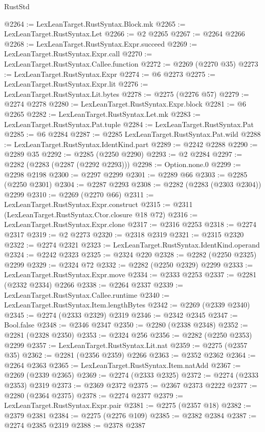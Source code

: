 \begin{lexlean}{RustStd}
\begin{coremodule}
{\begin{coremodule}
{{{{{{{{{{{{{{@2264 := LexLeanTarget.RustSyntax.Block.mk
@2265 := LexLeanTarget.RustSyntax.Let
@2266 := @2 @2265
@2267 := @2264 @2266
@2268 := LexLeanTarget.RustSyntax.Expr.succeed
@2269 := LexLeanTarget.RustSyntax.Expr.call
@2270 := LexLeanTarget.RustSyntax.Callee.function
@2272 := @2269 (@2270 @35)
@2273 := LexLeanTarget.RustSyntax.Expr
@2274 := @6 @2273
@2275 := LexLeanTarget.RustSyntax.Expr.lit
@2276 := LexLeanTarget.RustSyntax.Lit.bytes
@2278 := @2275 (@2276 @57)
@2279 := @2274 @2278
@2280 := LexLeanTarget.RustSyntax.Expr.block
@2281 := @6 @2265
@2282 := LexLeanTarget.RustSyntax.Let.mk
@2283 := LexLeanTarget.RustSyntax.Pat.tuple
@2284 := LexLeanTarget.RustSyntax.Pat
@2285 := @6 @2284
@2287 := @2285 LexLeanTarget.RustSyntax.Pat.wild
@2288 := LexLeanTarget.RustSyntax.IdentKind.part
@2289 := @2242 @2288
@2290 := @2289 @35
@2292 := @2285 (@2250 @2290)
@2293 := @2 @2284
@2297 := @2282 (@2283 (@2287 (@2292 @2293)))
@2298 := Option.none.{0}
@2299 := @2298 @2198
@2300 := @2297 @2299
@2301 := @2289 @66
@2303 := @2285 (@2250 @2301)
@2304 := @2287 @2293
@2308 := @2282 (@2283 (@2303 @2304)) @2299
@2310 := @2269 (@2270 @66)
@2311 := LexLeanTarget.RustSyntax.Expr.construct
@2315 := @2311 (LexLeanTarget.RustSyntax.Ctor.closure @18 @72)
@2316 := LexLeanTarget.RustSyntax.Expr.clone
@2317 := @2316 @2253
@2318 := @2274 @2317
@2319 := @2 @2273
@2320 := @2318 @2319
@2321 := @2315 @2320
@2322 := @2274 @2321
@2323 := LexLeanTarget.RustSyntax.IdentKind.operand
@2324 := @2242 @2323
@2325 := @2324 @220
@2328 := @2282 (@2250 @2325) @2299
@2329 := @2324 @72
@2332 := @2282 (@2250 @2329) @2299
@2333 := LexLeanTarget.RustSyntax.Expr.move
@2334 := @2333 @2253
@2337 := @2281 (@2332 @2334) @2266
@2338 := @2264 @2337
@2339 := LexLeanTarget.RustSyntax.Callee.runtime
@2340 := LexLeanTarget.RustSyntax.Item.lengthBytes
@2342 := @2269 (@2339 @2340)
@2345 := @2274 (@2333 @2329) @2319
@2346 := @2342 @2345
@2347 := Bool.false
@2348 := @2346 @2347
@2350 := @2280 (@2338 @2348)
@2352 := @2281 (@2328 @2350)
@2353 := @2324 @256
@2356 := @2282 (@2250 @2353) @2299
@2357 := LexLeanTarget.RustSyntax.Lit.nat
@2359 := @2275 (@2357 @35)
@2362 := @2281 (@2356 @2359) @2266
@2363 := @2352 @2362
@2364 := @2264 @2363
@2365 := LexLeanTarget.RustSyntax.Item.natAdd
@2367 := @2269 (@2339 @2365)
@2369 := @2274 (@2333 @2325)
@2372 := @2274 (@2333 @2353) @2319
@2373 := @2369 @2372
@2375 := @2367 @2373 @2222
@2377 := @2280 (@2364 @2375)
@2378 := @2274 @2377
@2379 := LexLeanTarget.RustSyntax.Expr.pair
@2381 := @2275 (@2357 @18)
@2382 := @2379 @2381
@2384 := @2275 (@2276 @109)
@2385 := @2382 @2384
@2387 := @2274 @2385 @2319
@2388 := @2378 @2387
}}}}}}}}}}}}}}
\end{coremodule}}
\end{coremodule}
\end{lexlean}
